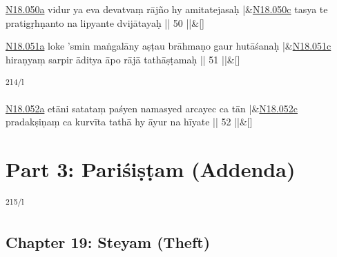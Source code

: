 \documentclass[article,12pt,a4paper]{memoir}%
\begin{document}
	  
	  
	    
	    \stanza[\smallbreak]
	  \href{http://sarit.indology.info/?cref=n\%C4\%81sm.18.050a}{N18.050a} vidur ya eva devatvaṃ rājño hy amitatejasaḥ |&\href{http://sarit.indology.info/?cref=n\%C4\%81sm.18.050c}{N18.050c} tasya te pratigṛhṇanto na lipyante dvijātayaḥ || 50 ||\&[\smallbreak]
	  
	  
	  
	    
	    \stanza[\smallbreak]
	  \href{http://sarit.indology.info/?cref=n\%C4\%81sm.18.051a}{N18.051a} loke 'smin maṅgalāny aṣṭau brāhmaṇo gaur hutāśanaḥ |&\href{http://sarit.indology.info/?cref=n\%C4\%81sm.18.051c}{N18.051c} hiraṇyaṃ sarpir āditya āpo rājā tathāṣṭamaḥ || 51 ||\&[\smallbreak]
	  
	  
	  \textsuperscript{\textenglish{214/l}}
	    
	    \stanza[\smallbreak]
	  \href{http://sarit.indology.info/?cref=n\%C4\%81sm.18.052a}{N18.052a} etāni satataṃ paśyen namasyed arcayec ca tān |&\href{http://sarit.indology.info/?cref=n\%C4\%81sm.18.052c}{N18.052c} pradakṣiṇaṃ ca kurvīta tathā hy āyur na hīyate || 52 ||\&[\smallbreak]
	  
	  
	  
	    
	    \endnumbering%
	    \endgroup
	    
	  
	  
	
	    
	    \begingroup
	    \beginnumbering%
	    
	  
\part{{\protect\textenglish Part 3: Pariśiṣṭam (Addenda)}}\textsuperscript{\textenglish{215/l}}
	  
	
\chapter[{Chapter 19: Steyam (Theft)}][{Chapter 19: Steyam (Theft)}]{{\protect\textenglish Chapter 19: Steyam (Theft)}}
	    
\end{document}
